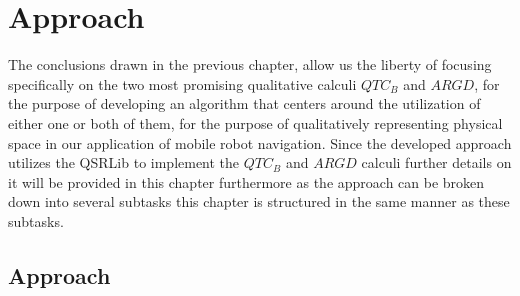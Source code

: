 
\chapter{Approach}
The conclusions drawn in the previous chapter, allow us the liberty of focusing specifically on the two most promising qualitative calculi $QTC_B$ and $ARGD$, for the purpose of developing an algorithm that centers around the utilization of either one or both of them, for the purpose of qualitatively representing physical space in our application of mobile robot navigation. Since the developed approach utilizes the QSRLib to implement the $QTC_B$ and $ARGD$ calculi further details on it will be provided in this chapter furthermore as the approach can be broken down into several subtasks this chapter is structured in the same manner as these subtasks.



\section{Approach}
